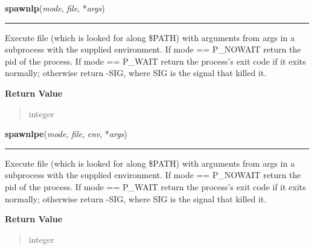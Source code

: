     \label{os:spawnlp}

    \vspace{0.5ex}

\hspace{.8\funcindent}\begin{boxedminipage}{\funcwidth}

    \raggedright \textbf{spawnlp}(\textit{mode}, \textit{file}, *\textit{args})

    \vspace{-1.5ex}

    \rule{\textwidth}{0.5\fboxrule}
\setlength{\parskip}{2ex}
    Execute file (which is looked for along \$PATH) with arguments from 
    args in a subprocess with the supplied environment. If mode == 
    P\_NOWAIT return the pid of the process. If mode == P\_WAIT return the 
    process's exit code if it exits normally; otherwise return -SIG, where 
    SIG is the signal that killed it.

\setlength{\parskip}{1ex}
      \textbf{Return Value}
    \vspace{-1ex}

      \begin{quote}
      integer

      \end{quote}

    \end{boxedminipage}

    \label{os:spawnlpe}

    \vspace{0.5ex}

\hspace{.8\funcindent}\begin{boxedminipage}{\funcwidth}

    \raggedright \textbf{spawnlpe}(\textit{mode}, \textit{file}, \textit{env}, *\textit{args})

    \vspace{-1.5ex}

    \rule{\textwidth}{0.5\fboxrule}
\setlength{\parskip}{2ex}
    Execute file (which is looked for along \$PATH) with arguments from 
    args in a subprocess with the supplied environment. If mode == 
    P\_NOWAIT return the pid of the process. If mode == P\_WAIT return the 
    process's exit code if it exits normally; otherwise return -SIG, where 
    SIG is the signal that killed it.

\setlength{\parskip}{1ex}
      \textbf{Return Value}
    \vspace{-1ex}

      \begin{quote}
      integer

      \end{quote}

    \end{boxedminipage}

